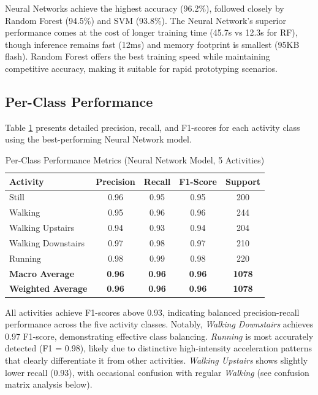 Neural Networks achieve the highest accuracy (96.2\%), followed closely by Random Forest (94.5\%) and SVM (93.8\%). The Neural Network's superior performance comes at the cost of longer training time (45.7s vs 12.3s for RF), though inference remains fast (12ms) and memory footprint is smallest (95KB flash). Random Forest offers the best training speed while maintaining competitive accuracy, making it suitable for rapid prototyping scenarios.

\subsection{Per-Class Performance}
Table \ref{tab:perclass_metrics} presents detailed precision, recall, and F1-scores for each activity class using the best-performing Neural Network model.

\begin{table}[H]
    \centering
    \caption{Per-Class Performance Metrics (Neural Network Model, 5 Activities)}
    \begin{tabular}{@{}lcccc@{}}
        \toprule
        Activity & Precision & Recall & F1-Score & Support \\ 
        \midrule
        Still & 0.96 & 0.95 & 0.95 & 200 \\
        Walking & 0.95 & 0.96 & 0.96 & 244 \\
        Walking Upstairs & 0.94 & 0.93 & 0.94 & 204 \\
        Walking Downstairs & 0.97 & 0.98 & 0.97 & 210 \\
        Running & 0.98 & 0.99 & 0.98 & 220 \\
        \midrule
        \textbf{Macro Average} & \textbf{0.96} & \textbf{0.96} & \textbf{0.96} & \textbf{1078} \\
        \textbf{Weighted Average} & \textbf{0.96} & \textbf{0.96} & \textbf{0.96} & \textbf{1078} \\
        \bottomrule
    \end{tabular}
    \label{tab:perclass_metrics}
\end{table}

All activities achieve F1-scores above 0.93, indicating balanced precision-recall performance across the five activity classes. Notably, \textit{Walking Downstairs} achieves 0.97 F1-score, demonstrating effective class balancing. \textit{Running} is most accurately detected (F1 = 0.98), likely due to distinctive high-intensity acceleration patterns that clearly differentiate it from other activities. \textit{Walking Upstairs} shows slightly lower recall (0.93), with occasional confusion with regular \textit{Walking} (see confusion matrix analysis below).

